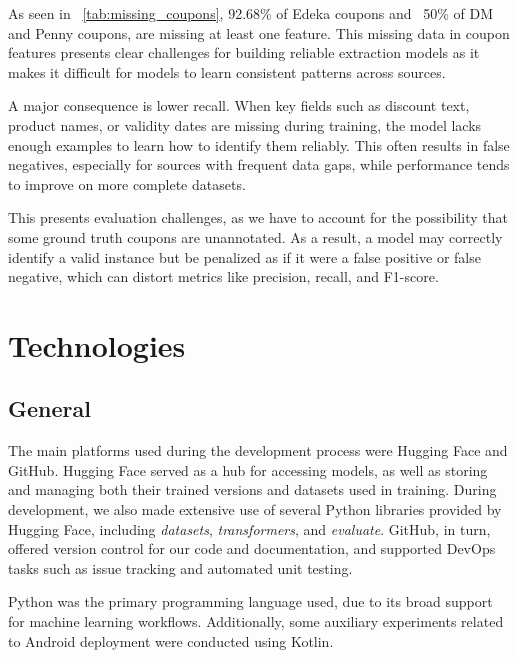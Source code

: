 \documentclass[licencjacka,en]{pracamgr}
\begin{document}
As seen in ~\ref{tab:missing_coupons}, 92.68\% of Edeka coupons and ~50\% of DM and Penny coupons, are missing at least one feature. This missing data in coupon features presents clear challenges for building reliable extraction models as it makes it difficult for models to learn consistent patterns across sources.

A major consequence is lower recall. When key fields such as discount text, product names, or validity dates are missing during training, the model lacks enough examples to learn how to identify them reliably. This often results in false negatives, especially for sources with frequent data gaps, while performance tends to improve on more complete datasets.

This presents evaluation challenges, as we have to account for the possibility that some ground truth coupons are unannotated. As a result, a model may correctly identify a valid instance but be penalized as if it were a false positive or false negative, which can distort metrics like precision, recall, and F1-score.

\chapter{Technologies} \label{chap:technologies}

\section{General}

The main platforms used during the development process were Hugging Face\cite{hugging-face} and GitHub\cite{github}. Hugging Face served as a hub for accessing models, as well as storing and managing both their trained versions and datasets used in training. During development, we also made extensive use of several Python libraries provided by Hugging Face, including \textit{datasets}\cite{lhoest2021datasetscommunitylibrarynatural}, \textit{transformers}\cite{wolf-etal-2020-transformers}, and \textit{evaluate}\cite{evaluate}. GitHub, in turn, offered version control for our code and documentation, and supported DevOps tasks such as issue tracking and automated unit testing.

Python\cite{python} was the primary programming language used, due to its broad support for machine learning workflows. Additionally, some auxiliary experiments related to Android deployment were conducted using Kotlin\cite{kotlin, service_demo_app_repo}.
\end{document}
